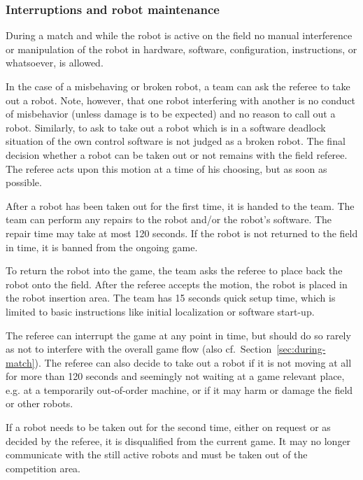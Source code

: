 \documentclass[12pt,twoside]{article}
\newcommand{\refsec}[1]{Section~\ref{#1}}
\begin{document}
\subsubsection{Interruptions and robot maintenance}
\label{sec:robot-maintenance}
During a match and while the robot is active on the field no manual
interference or manipulation of the robot in hardware, software,
configuration, instructions, or whatsoever, is allowed.

In the case of a misbehaving or broken robot, a team can ask the
referee to take out a robot. Note, however, that one robot interfering
with another is no conduct of misbehavior (unless damage is to be
expected) and no reason to call out a robot. Similarly, to ask to take
out a robot which is in a software deadlock situation of the own
control software is not judged as a broken robot. The final decision
whether a robot can be taken out or not remains with the field
referee. The referee acts upon this motion at a time of his choosing,
but as soon as possible.

After a robot has been taken out for the first time, it is handed to
the team. The team can perform any repairs to the robot and/or the
robot's software. %
The repair time may take at most 120 seconds. If the robot is not
returned to the field in time, it is banned from the ongoing game.

To return the robot into the game, the team asks the referee to place
back the robot onto the field. After the referee accepts the motion,
the robot is placed in the robot insertion area. The team has 15
seconds quick setup time, which is limited to basic instructions like
initial localization or software start-up.

The referee can interrupt the game at any point in time, but should do
so rarely as not to interfere with the overall game flow (also
cf.~\refsec{sec:during-match}). The referee can also decide to take
out a robot if it is not moving at all for more than 120 seconds and
seemingly not waiting at a game relevant place, e.g. at a temporarily
out-of-order machine, or if it may harm or damage the field or other
robots.

If a robot needs to be taken out for the second time, either on
request or as decided by the referee, it is disqualified from the
current game. It may no longer communicate with the still active
robots and must be taken out of the competition area.
\end{document}
